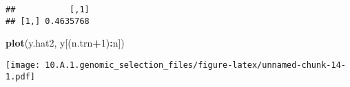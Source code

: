 \documentclass[
]{article}
\newenvironment{Shaded}{\begin{snugshade}}{\end{snugshade}}
\newcommand{\DecValTok}[1]{\textcolor[rgb]{0.00,0.00,0.81}{#1}}
\newcommand{\FunctionTok}[1]{\textcolor[rgb]{0.13,0.29,0.53}{\textbf{#1}}}
\newcommand{\NormalTok}[1]{#1}
\newcommand{\SpecialCharTok}[1]{\textcolor[rgb]{0.81,0.36,0.00}{\textbf{#1}}}
\begin{document}
\begin{verbatim}
##           [,1]
## [1,] 0.4635768
\end{verbatim}

\begin{Shaded}
\begin{Highlighting}[]
\FunctionTok{plot}\NormalTok{(y.hat2, y[(n.trn}\SpecialCharTok{+}\DecValTok{1}\NormalTok{)}\SpecialCharTok{:}\NormalTok{n])}
\end{Highlighting}
\end{Shaded}

\texttt{[image: 10.A.1.genomic\_selection\_files/figure-latex/unnamed-chunk-14-1.pdf]}
\end{document}
